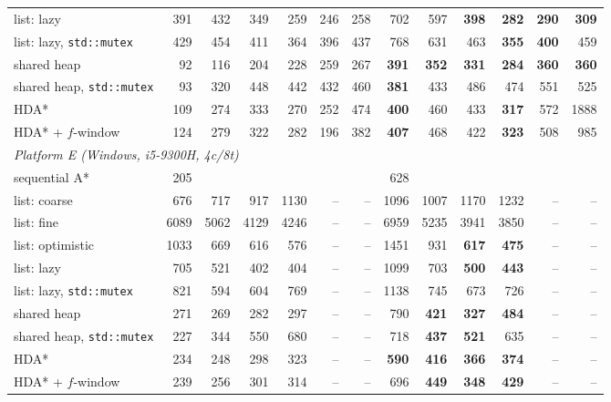 \begin{tabular}{lrrrrrrrrrrrr}
list: lazy & 391 & 432 & 349 & 259 & 246 & 258 & 702 & 597 & \textbf{398} & \textbf{282} & \textbf{290} & \textbf{309} \\
list: lazy, \texttt{std::mutex} & 429 & 454 & 411 & 364 & 396 & 437 & 768 & 631 & 463 & \textbf{355} & \textbf{400} & 459 \\
shared heap & 92 & 116 & 204 & 228 & 259 & 267 & \textbf{391} & \textbf{352} & \textbf{331} & \textbf{284} & \textbf{360} & \textbf{360} \\
shared heap, \texttt{std::mutex} & 93 & 320 & 448 & 442 & 432 & 460 & \textbf{381} & 433 & 486 & 474 & 551 & 525 \\
HDA* & 109 & 274 & 333 & 270 & 252 & 474 & \textbf{400} & 460 & 433 & \textbf{317} & 572 & 1888 \\
HDA* + $f$-window & 124 & 279 & 322 & 282 & 196 & 382 & \textbf{407} & 468 & 422 & \textbf{323} & 508 & 985 \\
\midrule
\multicolumn{13}{l}{\emph{Platform E (Windows, i5-9300H, 4c/8t)}} \\
sequential A* & 205 &  &  &  &  &  & 628 &  &  &  &  &  \\
list: coarse & 676 & 717 & 917 & 1130 & -- & -- & 1096 & 1007 & 1170 & 1232 & -- & -- \\
list: fine & 6089 & 5062 & 4129 & 4246 & -- & -- & 6959 & 5235 & 3941 & 3850 & -- & -- \\
list: optimistic & 1033 & 669 & 616 & 576 & -- & -- & 1451 & 931 & \textbf{617} & \textbf{475} & -- & -- \\
list: lazy & 705 & 521 & 402 & 404 & -- & -- & 1099 & 703 & \textbf{500} & \textbf{443} & -- & -- \\
list: lazy, \texttt{std::mutex} & 821 & 594 & 604 & 769 & -- & -- & 1138 & 745 & 673 & 726 & -- & -- \\
shared heap & 271 & 269 & 282 & 297 & -- & -- & 790 & \textbf{421} & \textbf{327} & \textbf{484} & -- & -- \\
shared heap, \texttt{std::mutex} & 227 & 344 & 550 & 680 & -- & -- & 718 & \textbf{437} & \textbf{521} & 635 & -- & -- \\
HDA* & 234 & 248 & 298 & 323 & -- & -- & \textbf{590} & \textbf{416} & \textbf{366} & \textbf{374} & -- & -- \\
HDA* + $f$-window & 239 & 256 & 301 & 314 & -- & -- & 696 & \textbf{449} & \textbf{348} & \textbf{429} & -- & -- \\
\bottomrule
\end{tabular}

